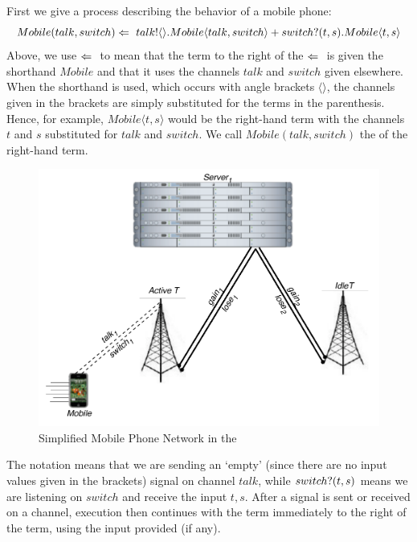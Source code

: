 	First we give a process describing the behavior of a mobile phone:
	\[
		Mobile(talk, switch) \Leftarrow\  {talk}!\langle{}\rangle. Mobile\langle talk,switch\rangle + {switch}?({t,s}). Mobile\langle t,s\rangle
	\]
	Above, we use $\Leftarrow\ $ to mean that the term to the right of the $\Leftarrow\ $ is given the shorthand $Mobile$ and that it uses the channels $talk$ and $switch$ given elsewhere.  
When the shorthand is used, which occurs with angle brackets $\langle\rangle$, the channels given in the brackets are simply substituted for the terms in the parenthesis.  
Hence, for example, $Mobile\langle t,s\rangle$ would be the right-hand term with the channels $t$ and $s$ substituted for $talk$ and $switch$. 
We call $Mobile(talk,switch)$ the  of the right-hand term.
	\begin{figure}[H]
	\centering
	\includegraphics[scale=0.7]{figures/cell_network_pi.pdf} %
	\caption{Simplified Mobile Phone Network in the \picalc}
	\label{fig_cell_network_pi}
	\end{figure}
	The notation  means that we are sending an `empty' (since there are no input values given in the brackets) signal on channel $talk$, while ${switch}?({t,s})$ means we are listening on $switch$ and receive the input $t,s$.  
After a signal is sent or received on a channel, execution then continues with the term immediately to the right of the term, using the input provided (if any).  

